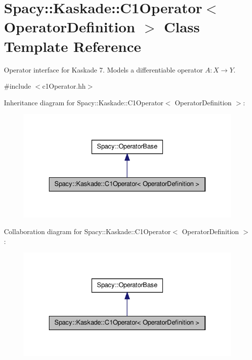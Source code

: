 \hypertarget{classSpacy_1_1Kaskade_1_1C1Operator}{\section{\-Spacy\-:\-:\-Kaskade\-:\-:\-C1\-Operator$<$ \-Operator\-Definition $>$ \-Class \-Template \-Reference}
\label{classSpacy_1_1Kaskade_1_1C1Operator}
}


\-Operator interface for \-Kaskade 7. \-Models a differentiable operator $A:X\rightarrow Y$.  




{\ttfamily \#include $<$c1\-Operator.\-hh$>$}



\-Inheritance diagram for \-Spacy\-:\-:\-Kaskade\-:\-:\-C1\-Operator$<$ \-Operator\-Definition $>$\-:
\nopagebreak
\begin{figure}[H]
\begin{center}
\leavevmode
\includegraphics[width=322pt]{classSpacy_1_1Kaskade_1_1C1Operator__inherit__graph}
\end{center}
\end{figure}


\-Collaboration diagram for \-Spacy\-:\-:\-Kaskade\-:\-:\-C1\-Operator$<$ \-Operator\-Definition $>$\-:
\nopagebreak
\begin{figure}[H]
\begin{center}
\leavevmode
\includegraphics[width=322pt]{classSpacy_1_1Kaskade_1_1C1Operator__coll__graph}
\end{center}
\end{figure}
